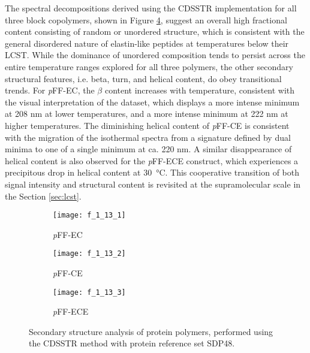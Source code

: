 \begin{refsection}
The spectral decompositions derived using the CDSSTR implementation for all
three block copolymers, shown in Figure \ref{fig:CD_computation}, suggest an
overall high fractional content consisting of random or unordered structure,
which is consistent with the general disordered nature of elastin-like peptides
at temperatures below their LCST.  While the dominance of unordered composition
tends to persist across the entire temperature ranges explored for all three
polymers, the other secondary structural features, i.e. beta, turn, and helical
content, do obey transitional trends. For \emph{p}FF-EC, the ${\beta}$ content
increases with temperature, consistent with the visual interpretation of the
dataset, which displays a more intense minimum at 208 nm at lower temperatures,
and a more intense minimum at 222 nm at higher temperatures. The diminishing
helical content of \emph{p}FF-CE is consistent with the migration of the
isothermal spectra from a signature defined by dual minima to one of a single
minimum at ca. 220 nm. A similar disappearance of helical content is also
observed for the \emph{p}FF-ECE construct, which experiences a precipitous drop
in helical content at \SI{30}{\celsius}. This cooperative transition of both
signal intensity and structural content is revisited at the supramolecular scale
in the Section \ref{sec:lcst}.

\begin{figure}[h!]
    \centering
    \begin{subfigure}[b]{0.32\textwidth}
        \centering
        \texttt{[image: f\_1\_13\_1]}
        \caption{\emph{p}FF-EC}
        \label{fig:CDcomp_ECpFF}
    \end{subfigure}
    \begin{subfigure}[b]{0.32\textwidth}
        \centering
        \texttt{[image: f\_1\_13\_2]}
        \caption{\emph{p}FF-CE}
        \label{fig:CDcomp_CEpFF}
    \end{subfigure}
    \begin{subfigure}[b]{0.32\textwidth}
        \centering
        \texttt{[image: f\_1\_13\_3]}
        \caption{\emph{p}FF-ECE}
        \label{fig:CDcomp_ECEpFF}
    \end{subfigure}
    \caption{Secondary structure analysis of protein polymers, performed using
    the CDSSTR method with protein reference set SDP48.}\label{fig:CD_computation}
\end{figure}

\end{refsection}
